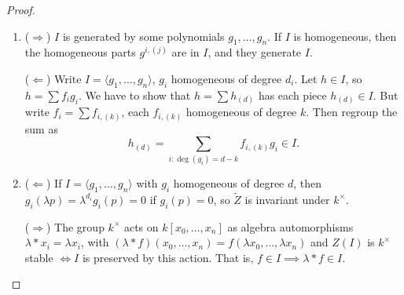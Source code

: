 \documentclass{article}
\begin{document}
\begin{proof}\leavevmode
    \begin{enumerate}[label=(\roman*)]
        \item ($\Rightarrow$) $I$ is generated by some polynomials $g_1, \dotsc, g_n$.
            If $I$ is homogeneous, then the homogeneous parts $g^{i,(j)}$ are in $I$, and they generate $I$.

            ($\Leftarrow$) Write $I = \langle g_1, \dotsc, g_n \rangle$, $g_i$ homogeneous of degree $d_i$.
            Let $h \in I$, so $h = \sum f_i g_i$.
            We have to show that $h = \sum h_{(d)}$ has each piece $h_{(d)} \in I$.
            But write $f_i = \sum f_{i,(k)}$, each $f_{i,(k)}$ homogeneous of degree $k$.
            Then regroup the sum as \begin{equation*}h_{(d)} = \sum_{i : \deg(g_i) = d-k} f_{i, (k)} g_i \in I.\end{equation*}

        \item ($\Leftarrow$) If $I = \langle g_1, \dotsc, g_n \rangle$ with $g_i$ homogeneous of degree $d$, then $g_i (\lambda p) = \lambda^{d_i} g_i(p) = 0$ if $g_i(p) = 0$, so $\tilde{Z}$ is invariant under $k^\times$.

            ($\Rightarrow$) The group $k^\times$ acts on $k[x_0, \dotsc, x_n]$ as algebra automorphisms $\lambda * x_i = \lambda x_i$, with $(\lambda * f) (x_0, \dotsc, x_n) = f(\lambda x_0, \dotsc, \lambda x_n)$ and $Z(I)$ is $k^\times$ stable $\iff I$ is preserved by this action.
            That is, $f \in I \implies \lambda * f \in I$.


\end{enumerate}
\end{proof}
\end{document}
